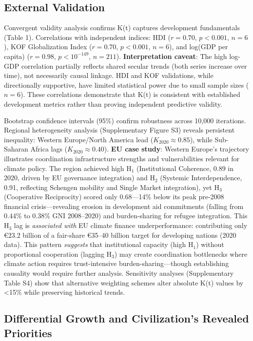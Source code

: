 \documentclass[11pt,letterpaper]{article}
\begin{document}
\subsection{External Validation}

Convergent validity analysis confirms K(t) captures development fundamentals (Table 1). Correlations with independent indices: HDI ($r=0.70$, $p<0.001$, $n=6$), KOF Globalization Index ($r=0.70$, $p<0.001$, $n=6$), and log(GDP per capita) ($r=0.98$, $p<10^{-149}$, $n=211$). \textbf{Interpretation caveat}: The high log-GDP correlation partially reflects shared secular trends (both series increase over time), not necessarily causal linkage. HDI and KOF validations, while directionally supportive, have limited statistical power due to small sample sizes ($n=6$). These correlations demonstrate that K(t) is consistent with established development metrics rather than proving independent predictive validity.

Bootstrap confidence intervals (95\%) confirm robustness across 10,000 iterations. Regional heterogeneity analysis (Supplementary Figure S3) reveals persistent inequality: Western Europe/North America lead ($K_{2020} \approx 0.85$), while Sub-Saharan Africa lags ($K_{2020} \approx 0.40$). \textbf{EU case study}: Western Europe's trajectory illustrates coordination infrastructure strengths and vulnerabilities relevant for climate policy. The region achieved high H$_1$ (Institutional Coherence, 0.89 in 2020, driven by EU governance integration) and H$_2$ (Systemic Interdependence, 0.91, reflecting Schengen mobility and Single Market integration), yet H$_3$ (Cooperative Reciprocity) scored only 0.68---14\% below its peak pre-2008 financial crisis---revealing erosion in development aid commitments (falling from 0.44\% to 0.38\% GNI 2008--2020) and burden-sharing for refugee integration. This H$_3$ lag is \textit{associated with} EU climate finance underperformance: contributing only €23.2 billion of a fair-share €35--40 billion target for developing nations (2020 data). This pattern \textit{suggests} that institutional capacity (high H$_1$) without proportional cooperation (lagging H$_3$) may create coordination bottlenecks where climate action requires trust-intensive burden-sharing---though establishing causality would require further analysis. Sensitivity analyses (Supplementary Table S4) show that alternative weighting schemes alter absolute K(t) values by <15\% while preserving historical trends.

\subsection{Differential Growth and Civilization's Revealed Priorities}
\end{document}

